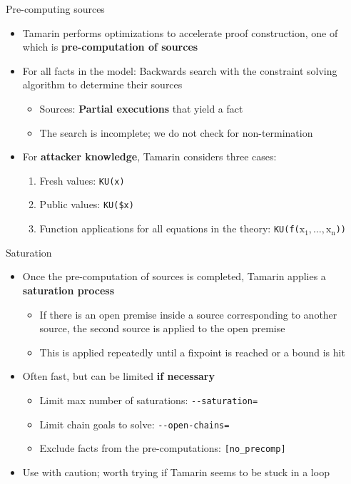 \documentclass[11pt,aspectratio=169]{beamer}
\begin{document}
\begin{frame}[fragile]{Pre-computing sources}
    \begin{itemize}
        \item Tamarin performs optimizations to accelerate proof construction, 
              one of which is \textbf{pre-computation of sources}
        \item For all facts in the model: Backwards search with the constraint 
              solving algorithm to determine their sources
        \begin{itemize}
            \item Sources: \textbf{Partial executions} that yield a fact
            \item The search is incomplete; we do not check for non-termination
        \end{itemize}
        \item For \textbf{attacker knowledge}, Tamarin considers three cases:
        \begin{enumerate}
            \item Fresh values: \texttt{KU(\tildelow{}x)}
            \item Public values: \texttt{KU(\$x)}
            \item Function applications for all equations in the theory:
                  \texttt{KU(f($\mathrm{x_1, \dots, x_n}$))}
        \end{enumerate}
    \end{itemize}
\end{frame}

\begin{frame}[fragile]{Saturation}
    \begin{itemize}
        \item Once the pre-computation of sources is completed, Tamarin applies 
              a \textbf{saturation process}
        \begin{itemize}
            \item If there is an open premise inside a source corresponding to 
                  another source, the second source is applied to the open 
                  premise
            \item This is applied repeatedly until a fixpoint is reached or a 
                  bound is hit
        \end{itemize}
        \item Often fast, but can be limited \textbf{if necessary}
        \begin{itemize}
            \item Limit max number of saturations: \verb|--saturation=|
            \item Limit chain goals to solve: \verb|--open-chains=|
            \item Exclude facts from the pre-computations: \verb|[no_precomp]|
        \end{itemize}
        \item Use with caution; worth trying if Tamarin seems to be stuck in a
              loop
    \end{itemize}
\end{frame}
\end{document}
